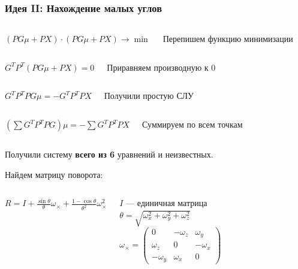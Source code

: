 \documentclass{beamer}
\begin{document}

\begin{frame}
\begin{spacing}{1.5}
	\frametitle{Идея II: Нахождение малых углов}
	\begin{columns}[c]
		$(P G \mu + P X) \cdot (P G \mu + P X) \rightarrow \min$
		
		Перепишем функцию минимизации
	\end{columns}
	
	\begin{columns}[c]
		$G^T P^T (P G \mu + P X) = 0$
		
		Приравняем производную к $0$
	\end{columns}
	
	\begin{columns}[c]
		$G^T P^T P G \mu = - G^T P^T P X$
		
		Получили простую СЛУ
	\end{columns}
	
	\begin{columns}[c]
		$(\sum G^T P^T P G) \mu = - \sum G^T P^T P X$
		
		Суммируем по всем точкам
	\end{columns}
	
	Получили систему \textbf{всего из 6} уравнений и неизвестных.
	
	Найдем матрицу поворота:
	\begin{columns}[c]
		$R = I + \frac{\sin{\theta}}{\theta} \omega_{\times} + \frac{1 - \cos{\theta}}{\theta^2} \omega_{\times}^2$
		
		$I$ --- единичная матрица\\
		$\theta = \sqrt{\omega_x^2 + \omega_y^2 + \omega_z^2}$\\
		$\omega_{\times} = 
		\begin{pmatrix} 
		0 & -\omega_z & \omega_y \\
		\omega_z & 0 & -\omega_x \\
		-\omega_y & \omega_x & 0
		\end{pmatrix}$
	\end{columns}
\end{spacing}
\end{frame}
\end{document}
